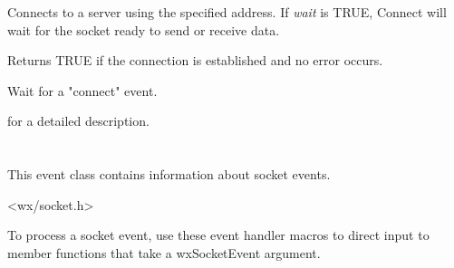 Connects to a server using the specified address. If {\it wait} is TRUE, Connect
will wait for the socket ready to send or receive data.





Returns TRUE if the connection is established and no error occurs.



%
%
\label{wxsocketclientwaitonconnect}


Wait for a "connect" event.


 for a detailed description.

\section{}\label{wxsocketevent}

This event class contains information about socket events.




<wx/socket.h>


To process a socket event, use these event handler macros to direct input to member
functions that take a wxSocketEvent argument.

\twocolwidtha{7cm}
\begin{twocollist}\itemsep=0pt
\end{twocollist}%

